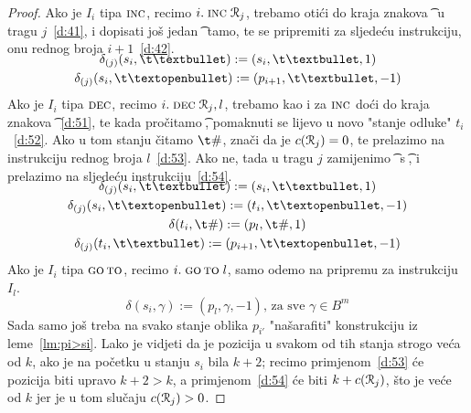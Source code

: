 \begin{proof}
Ako je $I_i$ tipa $\textsc{inc}$, recimo  $i.\;\textsc{inc}\;\mathcal R_{j}$, trebamo otići do kraja znakova \t\textbullet\ u tragu $j$~\eqref{d:41}, i dopisati još jedan \t\textbullet\ tamo, te se pripremiti za sljedeću instrukciju, onu rednog broja $i+1$~\eqref{d:42}.
\begin{gather}
\SwapAboveDisplaySkip
\label{d:41}
    \delta_{(j)}(s_i,\t\textbullet):=(s_i,\t\textbullet,1)\\
\label{d:42}
    \delta_{(j)}(s_i,\t\textopenbullet):=(p_{i+1},\t\textbullet,-1)
\end{gather}
Ako je $I_i$ tipa $\textsc{dec}$, recimo $i.\;\textsc{dec}\;\mathcal R_{j},l$, trebamo kao i za $\textsc{inc}$ doći do kraja znakova~\t\textbullet~\eqref{d:51}, te kada pročitamo \t\textopenbullet, pomaknuti se lijevo u novo "stanje odluke" $t_i$~\eqref{d:52}. Ako u tom stanju čitamo $\t\#$, znači da je $c(\mathcal R_{j})=0$, te prelazimo na instrukciju rednog broja $l$~\eqref{d:53}. Ako ne, tada u tragu $j$ zamijenimo \t\textbullet\ s \t\textopenbullet, i prelazimo na sljedeću instrukciju~\eqref{d:54}.
\begin{gather}
\SwapAboveDisplaySkip
\label{d:51}
    \delta_{(j)}(s_i,\t\textbullet):=(s_i,\t\textbullet,1)\\
\label{d:52}
    \delta_{(j)}(s_i,\t\textopenbullet):=(t_i,\t\textopenbullet,-1)\\
\label{d:53}
    \delta(t_i,\t\#):=(p_l,\t\#,1)\\
\label{d:54}
    \delta_{(j)}(t_i,\t\textbullet):=(p_{i+1},\t\textopenbullet,-1)
\end{gather}
Ako je $I_i$ tipa $\textsc{go\,to}$, recimo $i.\;\textsc{go\,to}\;l$, samo odemo na pripremu za instrukciju $I_l$.
\begin{equation}
\label{d:61}
    \delta(s_i,\gamma):=(p_l,\gamma,-1)\text{, za sve $\gamma\in B^m$}
\end{equation}
Sada samo još treba na svako stanje oblika $p_{i'}$ "našarafiti" konstrukciju iz leme~\ref{lm:pi>si}. Lako je vidjeti da je pozicija u svakom od tih stanja strogo veća od $k$, ako je na početku u stanju $s_i$ bila $k+2$; recimo primjenom~\eqref{d:53} će pozicija biti upravo $k+2>k$, a primjenom~\eqref{d:54} će biti $k+c(\mathcal R_{j})$, što je veće od $k$ jer je u tom slučaju $c(\mathcal R_{j})>0$.
\end{proof}

